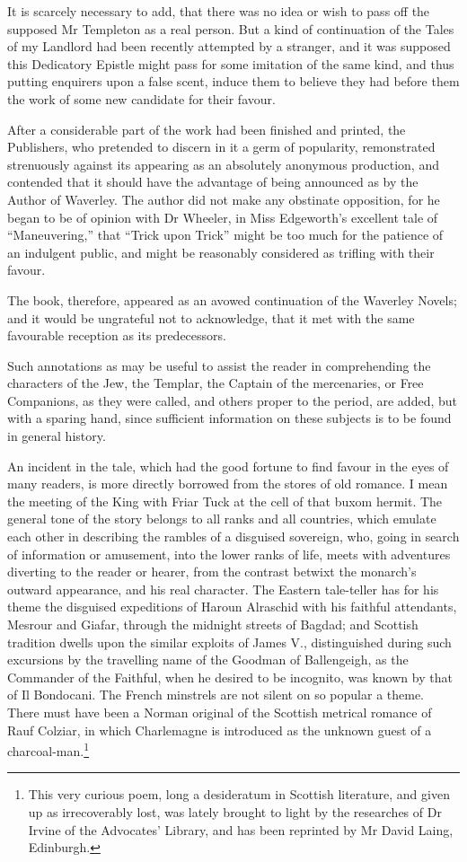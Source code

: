 It is scarcely necessary to add, that there was no idea or wish to pass
off the supposed Mr Templeton as a real person. But a kind of
continuation of the Tales of my Landlord had been recently attempted by
a stranger, and it was supposed this Dedicatory Epistle might pass for
some imitation of the same kind, and thus putting enquirers upon a false
scent, induce them to believe they had before them the work of some new
candidate for their favour.

After a considerable part of the work had been finished and printed, the
Publishers, who pretended to discern in it a germ of popularity,
remonstrated strenuously against its appearing as an absolutely
anonymous production, and contended that it should have the advantage of
being announced as by the Author of Waverley. The author did not make
any obstinate opposition, for he began to be of opinion with Dr Wheeler,
in Miss Edgeworth's excellent tale of ``Maneuvering,'' that ``Trick upon
Trick'' might be too much for the patience of an indulgent public, and
might be reasonably considered as trifling with their favour.

The book, therefore, appeared as an avowed continuation of the Waverley
Novels; and it would be ungrateful not to acknowledge, that it met with
the same favourable reception as its predecessors.

Such annotations as may be useful to assist the reader in comprehending
the characters of the Jew, the Templar, the Captain of the mercenaries,
or Free Companions, as they were called, and others proper to the
period, are added, but with a sparing hand, since sufficient information
on these subjects is to be found in general history.

An incident in the tale, which had the good fortune to find favour in
the eyes of many readers, is more directly borrowed from the stores of
old romance. I mean the meeting of the King with Friar Tuck at the cell
of that buxom hermit. The general tone of the story belongs to all ranks
and all countries, which emulate each other in describing the rambles of
a disguised sovereign, who, going in search of information or amusement,
into the lower ranks of life, meets with adventures diverting to the
reader or hearer, from the contrast betwixt the monarch's outward
appearance, and his real character. The Eastern tale-teller has for his
theme the disguised expeditions of Haroun Alraschid with his faithful
attendants, Mesrour and Giafar, through the midnight streets of Bagdad;
and Scottish tradition dwells upon the similar exploits of James V.,
distinguished during such excursions by the travelling name of the
Goodman of Ballengeigh, as the Commander of the Faithful, when he
desired to be incognito, was known by that of Il Bondocani. The French
minstrels are not silent on so popular a theme. There must have been a
Norman original of the Scottish metrical romance of Rauf Colziar, in
which Charlemagne is introduced as the unknown guest of a
charcoal-man.\footnote{This very curious poem, long a desideratum
in Scottish
literature, and given up as irrecoverably lost, was lately brought to
light by the researches of Dr Irvine of the Advocates' Library, and has
been reprinted by Mr David Laing, Edinburgh.}


